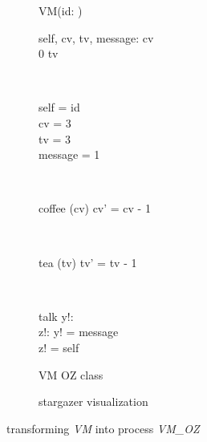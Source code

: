 \begin{figure}[H]
\begin{subfigure}{.6\textwidth}
\centering
\begin{class}{VM(id: \integer)}
\\
\begin{state}
self, cv, tv, message: \integer
{} \leq  cv 
\\
0 \leq  tv 
\end{state} 
\\
\begin{init}
self = id
\\cv = 3
\\tv = 3
\\message = 1
\end{init} 
\\
\begin{op}{coffee}
\Delta (cv)
\ST
cv' = cv - 1
\end{op}
\\
\begin{op}{tea}
\Delta (tv)
\ST
tv' = tv - 1
\end{op}
\\
\begin{op}{talk}
y!: \integer
\\z!: \integer
\ST
y! = message
\\z! = self
\end{op}
\end{class}
  \caption{VM OZ class}
\end{subfigure}%
\begin{subfigure}{.4\textwidth}
  \centering
{}
  \caption{stargazer visualization}
\end{subfigure}
\caption{transforming \textit{VM} into \picalc{} process \textit{VM\_OZ}}
\label{tra_vm_OZ}
\end{figure}

